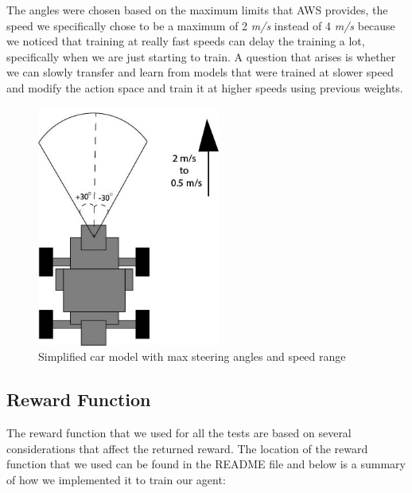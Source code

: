 \documentclass[journal]{IEEEtran}
\begin{document}
The angles were chosen based on the maximum limits that AWS provides, the speed we specifically chose to be a maximum of 2 \emph{m/s} instead of 4 \emph{m/s} because we noticed that training at really fast speeds can delay the training a lot, specifically when we are just starting to train.  A question that arises is whether we can slowly transfer and learn from models that were trained at slower speed and modify the action space and train it at higher speeds using previous weights. 

\begin{figure}[htbp]
\begin{center}
\includegraphics[width=6cm]{model-S}
\end{center}
\vspace{-2mm}
\caption{Simplified car model with max steering angles and speed range}
\label{car}
\end{figure}

\subsection{Reward Function}
The reward function that we used for all the tests are based on several considerations that affect the returned reward.  The location of the reward function that we used can be found in the README file and below is a summary of how we implemented it to train our agent:
\end{document}

